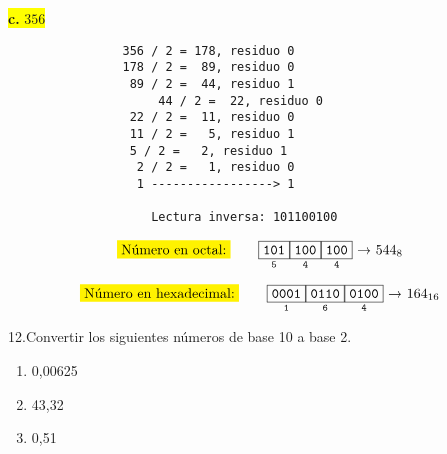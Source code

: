 \documentclass[a4paper,12pt]{article}
\begin{document}
\begin{center}	
	\colorbox{yellow}{{\textbf{c.} $356$}} \\ \vspace{0.3cm}
	    	\begin{Verbatim}
	    		356 / 2 = 178, residuo 0
	    		178 / 2 =  89, residuo 0
	    		 89 / 2 =  44, residuo 1
	    	         44 / 2 =  22, residuo 0
	    		 22 / 2 =  11, residuo 0
	    		 11 / 2 =   5, residuo 1
	    	 	 5 / 2 =   2, residuo 1
	    		  2 / 2 =   1, residuo 0
	    		  1 -----------------> 1
		
	        	    Lectura inversa: 101100100
	\end{Verbatim}
	
	\[
	\mathtt{
		\colorbox{yellow}{Número en octal:} \qquad
		\underset{5}{\boxed{\mathtt{101}}}
		\underset{4}{\boxed{\mathtt{100}}}
		\underset{4}{\boxed{\mathtt{100}}}
		\text{ → $544_8$}
	}	
	\] 
	
	\[
	\mathtt{
		\colorbox{yellow}{Número en hexadecimal:} \qquad
		\underset{1}{\boxed{\mathtt{0001}}}
		\underset{6}{\boxed{\mathtt{0110}}}
		\underset{4}{\boxed{\mathtt{0100}}}
		\text{ → $164_{16}$}
	}	
	\]		
\end{center}	
	
	12.Convertir los siguientes números de base 10 a base 2.
	\begin{enumerate}
		\item 0,00625 
		\item 43,32 
		\item 0,51	
	\end{enumerate}
	
\end{document}
